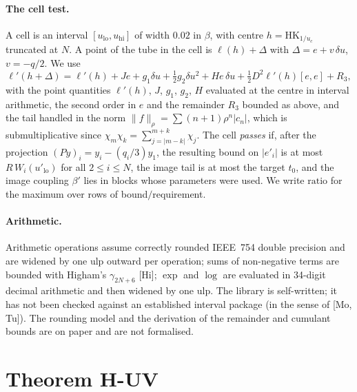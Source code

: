 \documentclass[11pt,a4paper]{article}
\theoremstyle{definition}
\theoremstyle{remark}
\newcommand{\HK}{\mathrm{HK}}
\begin{document}
\paragraph{The cell test.}
A cell is an interval $[u_{\mathrm{lo}},u_{\mathrm{hi}}]$ of width $0.02$ in $\beta$, with centre $h=\HK_{1/u_c}$ truncated at $N$.
A point of the tube in the cell is $\ell(h)+\Delta$ with $\Delta=e+v\,\delta u$, $v=-q/2$.
We use
\begin{equation}\label{eq:taylor}
\ell'(h+\Delta)=\ell'(h)+Je+g_1\delta u+\tfrac12g_2\delta u^2+He\,\delta u+\tfrac12D^2\ell'(h)[e,e]+R_3,
\end{equation}
with the point quantities $\ell'(h)$, $J$, $g_1$, $g_2$, $H$ evaluated at the centre in interval arithmetic, the second order in $e$ and the remainder $R_3$ bounded as above, and the tail handled in the norm $\|f\|_\rho=\sum(n+1)\rho^n|c_n|$, which is submultiplicative since $\chi_m\chi_k=\sum_{j=|m-k|}^{m+k}\chi_j$.
The cell \emph{passes} if, after the projection $(Py)_i=y_i-(q_i/3)y_1$, the resulting bound on $|e'_i|$ is at most $R\,W_i(u'_{\mathrm{lo}})$ for all $2\le i\le N$, the image tail is at most the target $t_0$, and the image coupling $\beta'$ lies in blocks whose parameters were used.
We write $\mathrm{ratio}$ for the maximum over rows of bound$/$requirement.

\paragraph{Arithmetic.}
Arithmetic operations assume correctly rounded IEEE~754 double precision and are widened by one ulp outward per operation; sums of non-negative terms are bounded with Higham's $\gamma_{2N+6}$ [Hi]; $\exp$ and $\log$ are evaluated in 34-digit decimal arithmetic and then widened by one ulp.
The library is self-written; it has not been checked against an established interval package (in the sense of [Mo, Tu]).
The rounding model and the derivation of the remainder and cumulant bounds are on paper and are not formalised.

\section{Theorem H-UV}\label{sec:huv}
\end{document}
